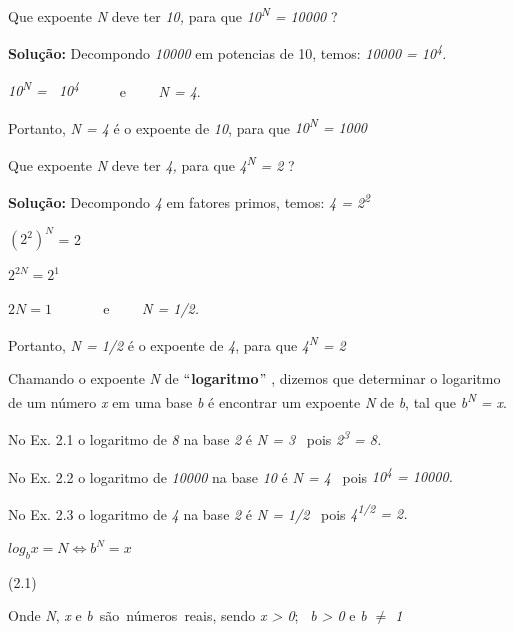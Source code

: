 \begin{texemplo}
    Que expoente \textit{N} deve ter \textit{10,} para que \textit{10\textsuperscript{N} = 10000 } ? 

    \textbf{Solução:} Decompondo \textit{10000} em potencias de 10, temos: \textit{10000 = 10\textsuperscript{4}.} 

    \textit{10\textsuperscript{N} =~ 10\textsuperscript{4}~~~~~ }e~~~~ \textit{N = 4}.

    Portanto, \textit{N = 4} é o expoente de \textit{10}, para que \textit{10\textsuperscript{N} = 1000}\qedsymbol{}
\end{texemplo}

\begin{texemplo}
    Que expoente \textit{N} deve ter \textit{4,} para que \textit{4\textsuperscript{N} = 2 } ? 

    \textbf{Solução:} Decompondo \textit{4} em fatores primos, temos: \textit{4 = 2\textsuperscript{2}} 

    \(  \left( 2^{2} \right) ^{N} \) = 2~~~ 

    \( 2^{2N}=2^{1} \) ~~~ 

    \( 2N=1 \) ~~~~~~ e~~~~ \textit{N = 1/2.}

    Portanto, \textit{N = 1/2} é o expoente de \textit{4}, para que \textit{4\textsuperscript{N} = 2}\qedsymbol{}
\end{texemplo}

Chamando o expoente \textit{N} de $``$\textbf{logaritmo}$"$ , dizemos que determinar o logaritmo de um número \textit{x} em uma base \textit{b} é encontrar um expoente \textit{N} de \textit{b}, tal que \textit{b\textsuperscript{N} = x}.

No Ex. 2.1 o logaritmo de \textit{8} na base \textit{2} é \textit{N = 3}~ pois \textit{2\textsuperscript{3} = 8.}

No Ex. 2.2 o logaritmo de \textit{10000} na base \textit{10} é \textit{N = 4}~ pois \textit{10\textsuperscript{4} = 10000.}

No Ex. 2.3 o logaritmo de \textit{4} na base \textit{2} é \textit{N = 1/2}~ pois \textit{4\textsuperscript{1/2} = 2.}

\begin{caixa}
    \begin{tdefinicao}
        \( log_{b}x=N \Leftrightarrow b^{N}=x \) 
        \begin{flushright}
            (2.1)
        \end{flushright}

Onde \textit{N}, \textit{x} e \textit{b}~são~números~reais, sendo    \textit{x > 0};~ \textit{b > 0} e \textit{b $ \neq $  1}\qedsymbol{}

    \end{tdefinicao}
\end{caixa}

